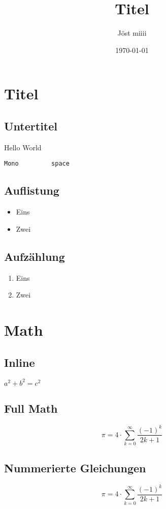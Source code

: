 \documentclass[a4paper, 10pt, fleqn]{article}
\title{Titel}
\author{Jöst miiii}
\date{\today} %
\begin{document}
\maketitle
\tableofcontents
\clearpage
\section{Titel}
\subsection{Untertitel}
Hello World

\verb!Mono         space!

\subsection{Auflistung}
\begin{itemize}
\item Eins
\item Zwei
\end{itemize}

\subsection{Aufzählung}
\begin{enumerate}[a]%
\item Eins
\item Zwei
\end{enumerate}

\section{Math}
\subsection{Inline}
$a^2 + b^2 = c^2$
\subsection{Full Math}
\[
\pi = 4 \cdot \sum\limits_{k=0}^\infty\frac{(-1)^k}{2 k + 1}
\]
\subsection{Nummerierte Gleichungen}
\begin{equation}
\pi = 4 \cdot \sum\limits_{k=0}^\infty\frac{(-1)^k}{2 k + 1}
\end{equation}
\end{document}
